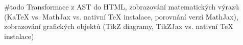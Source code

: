 \#todo Transformace z AST do HTML, zobrazování matematických výrazů (KaTeX vs. MathJax vs. nativní TeX instalace,
porovnání verzí MathJax), zobrazování grafických objektů (TikZ diagramy, TikZJax vs. nativní TeX instalace)
